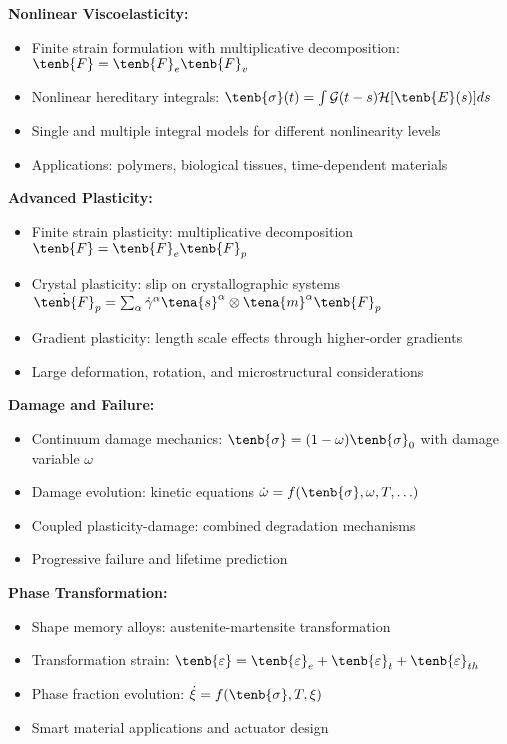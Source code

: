 \begin{subox}[Summary]
\textbf{Nonlinear Viscoelasticity:}
\begin{itemize}
\item Finite strain formulation with multiplicative decomposition: $\tenb{F} = \tenb{F}_e \tenb{F}_v$
\item Nonlinear hereditary integrals: $\tenb{\sigma}(t) = \int \mathcal{G}(t-s) \mathcal{H}[\tenb{E}(s)] ds$
\item Single and multiple integral models for different nonlinearity levels
\item Applications: polymers, biological tissues, time-dependent materials
\end{itemize}

\textbf{Advanced Plasticity:}
\begin{itemize}
\item Finite strain plasticity: multiplicative decomposition $\tenb{F} = \tenb{F}_e \tenb{F}_p$
\item Crystal plasticity: slip on crystallographic systems $\dot{\tenb{F}}_p = \sum_\alpha \dot{\gamma}^\alpha \tena{s}^\alpha \otimes \tena{m}^\alpha \tenb{F}_p$
\item Gradient plasticity: length scale effects through higher-order gradients
\item Large deformation, rotation, and microstructural considerations
\end{itemize}

\textbf{Damage and Failure:}
\begin{itemize}
\item Continuum damage mechanics: $\tenb{\sigma} = (1-\omega) \tenb{\sigma}_0$ with damage variable $\omega$
\item Damage evolution: kinetic equations $\dot{\omega} = f(\tenb{\sigma}, \omega, T, \ldots)$
\item Coupled plasticity-damage: combined degradation mechanisms
\item Progressive failure and lifetime prediction
\end{itemize}

\textbf{Phase Transformation:}
\begin{itemize}
\item Shape memory alloys: austenite-martensite transformation
\item Transformation strain: $\tenb{\varepsilon} = \tenb{\varepsilon}_e + \tenb{\varepsilon}_t + \tenb{\varepsilon}_{th}$
\item Phase fraction evolution: $\dot{\xi} = f(\tenb{\sigma}, T, \xi)$
\item Smart material applications and actuator design
\end{itemize}


\end{subox}
